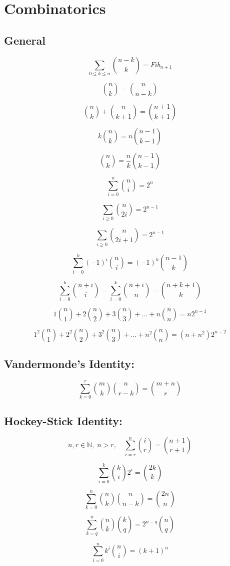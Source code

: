 \section*{Combinatorics}

\subsection*{General}

\[
\sum_{0 \leq k \leq n} \binom{n-k}{k} = Fib_{n+1}
\]

\[
\binom{n}{k} = \binom{n}{n-k}
\]

\[
\binom{n}{k} + \binom{n}{k+1} = \binom{n+1}{k+1}
\]

\[
k \binom{n}{k} = n \binom{n-1}{k-1}
\]

\[
\binom{n}{k} = \frac{n}{k} \binom{n-1}{k-1}
\]

\[
\sum_{i=0}^n \binom{n}{i} = 2^n
\]

\[
\sum_{i \geq 0} \binom{n}{2i} = 2^{n-1}
\]

\[
\sum_{i \geq 0} \binom{n}{2i+1} = 2^{n-1}
\]

\[
\sum_{i=0}^k (-1)^i \binom{n}{i} = (-1)^k \binom{n-1}{k}
\]

\[
\sum_{i=0}^k \binom{n+i}{i} = \sum_{i=0}^k \binom{n+i}{n} = \binom{n+k+1}{k}
\]

\[
1\binom{n}{1} + 2\binom{n}{2} + 3\binom{n}{3} + \dots + n\binom{n}{n} = n2^{n-1}
\]

\[
1^2 \binom{n}{1} + 2^2 \binom{n}{2} + 3^2 \binom{n}{3} + \dots + n^2 \binom{n}{n} = (n+n^2)2^{n-2}
\]


\subsection{Vandermonde’s Identity:}
\[
\sum_{k=0}^r \binom{m}{k}\binom{n}{r-k} = \binom{m+n}{r}
\]


\subsection{Hockey-Stick Identity:}
\[
n,r \in \mathbb{N}, \; n>r, \quad \sum_{i=r}^n \binom{i}{r} = \binom{n+1}{r+1}
\]

\[
\sum_{i=0}^k \binom{k}{i}2^i = \binom{2k}{k}
\]

\[
\sum_{k=0}^n \binom{n}{k}\binom{n}{n-k} = \binom{2n}{n}
\]

\[
\sum_{k=q}^n \binom{n}{k}\binom{k}{q} = 2^{n-q}\binom{n}{q}
\]

\[
\sum_{i=0}^n k^i \binom{n}{i} = (k+1)^n
\]


